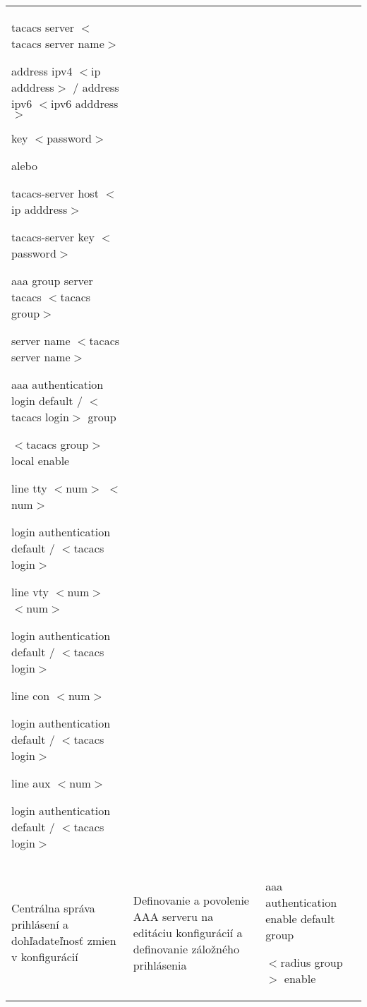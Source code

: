 \begin{longtable}[!htbp]{|L{10em}L{10em}>{\selectfont}L{34em}|}
	tacacs server $<$tacacs server name$>$
	
	\hspace{0.5em}address ipv4 $<$ip adddress$>$ / address ipv6 $<$ipv6 adddress$>$
	
	\hspace{0.5em}key $<$password$>$
	\vspace{0.5em}
	
	{\selectfont alebo}
	
	\vspace{0.5em}
	tacacs-server host $<$ip adddress$>$
	
	tacacs-server key $<$password$>$
	
	\vspace{0.5em}
	
	aaa group server tacacs $<$tacacs group$>$
	
	\hspace{0.5em}server name $<$tacacs server name$>$
	
	aaa authentication login default / $<$tacacs login$>$ group 
	
	\hspace{0.5em}$<$tacacs group$>$ local enable
	
	line tty $<$num$>$ $<$num$>$
	
	\hspace{0.5em}login authentication default / $<$tacacs login$>$
	
	line vty $<$num$>$ $<$num$>$
	
	\hspace{0.5em}login authentication default / $<$tacacs login$>$
	
	line con $<$num$>$
	
	\hspace{0.5em}login authentication default / $<$tacacs login$>$
	
	line aux $<$num$>$
	
	
	\hspace{0.5em}login authentication default / $<$tacacs login$>$\\
	
	
	
	
	Centrálna správa prihlásení a dohľadateľnosť zmien v konfigurácií	&Definovanie a povolenie AAA serveru na editáciu konfigurácií a definovanie záložného prihlásenia	&aaa authentication enable default group 
	
	\hspace{0.5em}$<$radius group$>$ enable\\
	

\end{longtable}
